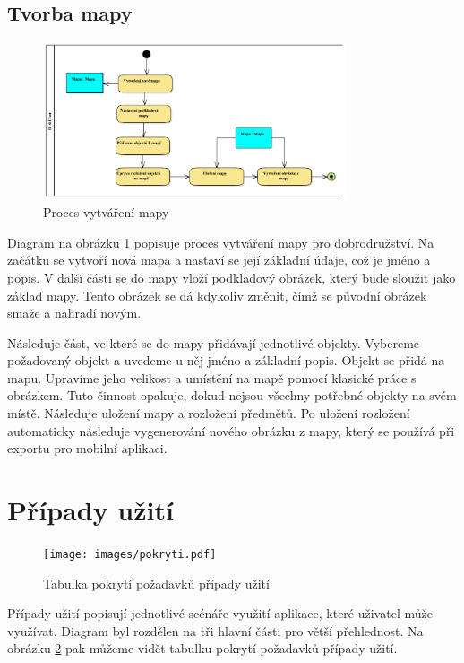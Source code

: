 \documentclass[thesis=B,czech]{resources/FITthesis}[2012/06/26]
\begin{document}
\subsection{Tvorba mapy}
\begin{figure}\centering
	\includegraphics[width=0.8\textwidth]{images/business_mapa}
	\caption[Proces vytváření mapy]{Proces vytváření mapy}\label{fig:bp_mapa}
\end{figure}	
Diagram na obrázku \ref{fig:bp_mapa} popisuje proces vytváření mapy pro dobrodružství. Na začátku se vytvoří nová mapa a nastaví se její základní údaje, což je jméno a popis. V další části se do mapy vloží podkladový obrázek, který bude sloužit jako základ mapy. Tento obrázek se dá kdykoliv změnit, čímž se původní obrázek smaže a nahradí novým. \par

Následuje část, ve které se do mapy přidávají jednotlivé objekty. Vybereme požadovaný objekt a uvedeme u něj jméno a základní popis. Objekt se přidá na mapu. Upravíme jeho velikost a umístění na mapě pomocí klasické práce s obrázkem. Tuto činnost opakuje, dokud nejsou všechny potřebné objekty na svém místě. Následuje uložení mapy a rozložení předmětů. Po uložení rozložení automaticky následuje vygenerování nového obrázku z mapy, který se používá při exportu pro mobilní aplikaci.

	\section{Případy užití}	
	\begin{figure}\centering
		\texttt{[image: images/pokryti.pdf]}
		\caption[Tabulka pokrytí požadavků případy užití]{Tabulka pokrytí požadavků případy užití}
		\label{fig:pokryti}
	\end{figure}
Případy užití popisují jednotlivé scénáře využití aplikace, které uživatel může využívat. Diagram byl rozdělen na tři hlavní části pro větší přehlednost. Na obrázku \ref{fig:pokryti} pak můžeme vidět tabulku pokrytí požadavků případy užití.
\end{document}
